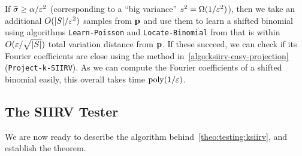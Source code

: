  If $\widetilde{\sigma} \geq \alpha/\varepsilon^2$ (corresponding to a ``big variance'' $s^2 = \Omega(1/\varepsilon^2)$), then we take an additional $O(|S|/\varepsilon^2)$ samples from $\mathbf{p}$ and use them to learn a shifted binomial using algorithms \texttt{Learn-Poisson} and \texttt{Locate-Binomial} from \cite{DDS:PBD:15} that is within $O(\varepsilon/\sqrt{|S|})$ total variation distance from $\mathbf{p}$. If these succeed,  we can check if its Fourier coefficients are close using the method in~\cref{algo:ksiirv-easy-projection} (\texttt{Project-k-SIIRV}). As we can compute the Fourier coefficients of a shifted binomial easily, this overall takes time $\operatorname*{poly}(1/\varepsilon)$.
 

 
\subsection{The SIIRV Tester}\label{sec:siirv:testing}
We are now ready to describe the algorithm behind~\cref{theo:testing:ksiirv}, and establish the theorem.
